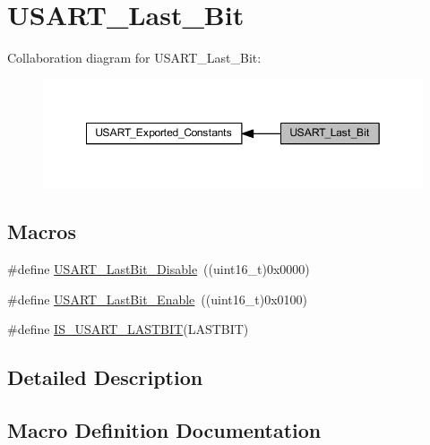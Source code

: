 \hypertarget{group___u_s_a_r_t___last___bit}{}\section{U\+S\+A\+R\+T\+\_\+\+Last\+\_\+\+Bit}
\label{group___u_s_a_r_t___last___bit}
Collaboration diagram for U\+S\+A\+R\+T\+\_\+\+Last\+\_\+\+Bit\+:
\nopagebreak
\begin{figure}[H]
\begin{center}
\leavevmode
\includegraphics[width=349pt]{group___u_s_a_r_t___last___bit}
\end{center}
\end{figure}
\subsection*{Macros}
\begin{DoxyCompactItemize}
\item 
\#define \hyperlink{group___u_s_a_r_t___last___bit_ga129c89b9e0dbb3ce43ee92589b3324e5}{U\+S\+A\+R\+T\+\_\+\+Last\+Bit\+\_\+\+Disable}~((uint16\+\_\+t)0x0000)
\item 
\#define \hyperlink{group___u_s_a_r_t___last___bit_gaf8c19d1ce01c6efff8c24ee82cc7b52e}{U\+S\+A\+R\+T\+\_\+\+Last\+Bit\+\_\+\+Enable}~((uint16\+\_\+t)0x0100)
\item 
\#define \hyperlink{group___u_s_a_r_t___last___bit_gaa941695e5612b53e9c2aca6a9fa0d695}{I\+S\+\_\+\+U\+S\+A\+R\+T\+\_\+\+L\+A\+S\+T\+B\+IT}(L\+A\+S\+T\+B\+IT)
\end{DoxyCompactItemize}


\subsection{Detailed Description}


\subsection{Macro Definition Documentation}
\mbox{\label{group___u_s_a_r_t___last___bit_gaa941695e5612b53e9c2aca6a9fa0d695}} 
